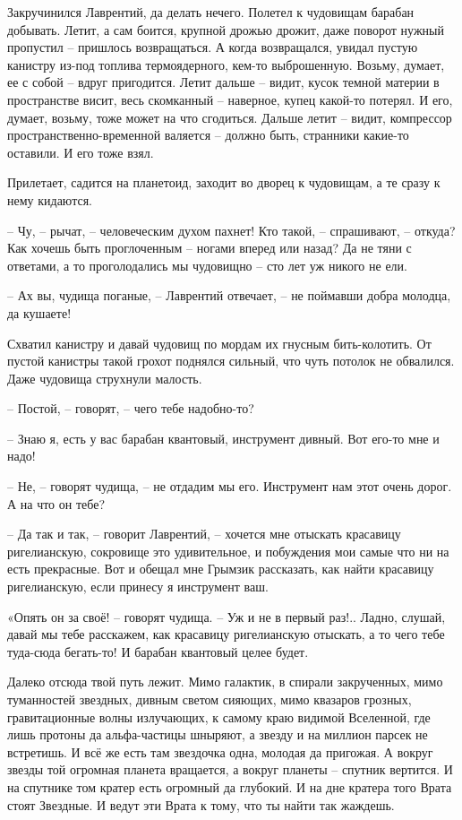 \documentclass[ebook,oneside,final,openright]{memoir}
\begin{document}
\par
Закручинился Лаврентий, да делать нечего. Полетел к чудовищам барабан добывать. Летит, а сам боится, крупной дрожью дрожит, даже поворот нужный пропустил – пришлось возвращаться. А когда возвращался, увидал пустую канистру из-под топлива термоядерного, кем-то выброшенную. Возьму, думает, ее с собой – вдруг пригодится. Летит дальше – видит, кусок темной материи в пространстве висит, весь скомканный – наверное, купец какой-то потерял. И его, думает, возьму, тоже может на что сгодиться. Дальше летит – видит, компрессор пространственно-временной валяется – должно быть, странники какие-то оставили. И его тоже взял.\par
\par
Прилетает, садится на планетоид, заходит во дворец к чудовищам, а те сразу к нему кидаются. \par
– Чу, – рычат, – человеческим духом пахнет! Кто такой, – спрашивают, – откуда? Как хочешь быть проглоченным – ногами вперед или назад? Да не тяни с ответами, а то проголодались мы чудовищно – сто лет уж никого не ели.\par
– Ах вы, чудища поганые, – Лаврентий отвечает, – не поймавши добра молодца, да кушаете! \par
Схватил канистру и давай чудовищ по мордам их гнусным бить-колотить. От пустой канистры такой грохот поднялся сильный, что чуть потолок не обвалился. Даже чудовища струхнули малость. \par
– Постой, – говорят, – чего тебе надобно-то?\par
– Знаю я, есть у вас барабан квантовый, инструмент дивный. Вот его-то мне и надо!\par
– Не, – говорят чудища, – не отдадим мы его. Инструмент нам этот очень дорог. А на что он тебе? \par
– Да так и так, – говорит Лаврентий, – хочется мне отыскать красавицу ригелианскую, сокровище это удивительное, и побуждения мои самые что ни на есть прекрасные. Вот и обещал мне Грымзик рассказать, как найти красавицу ригелианскую, если принесу я инструмент ваш. \par
\par
«Опять он за своё! – говорят чудища. – Уж и не в первый раз!.. Ладно, слушай, давай мы тебе расскажем, как красавицу ригелианскую отыскать, а то чего тебе туда-сюда бегать-то! И барабан квантовый целее будет. \par
\par
Далеко отсюда твой путь лежит. Мимо галактик, в спирали закрученных, мимо туманностей звездных, дивным светом сияющих, мимо квазаров грозных, гравитационные волны излучающих, к самому краю видимой Вселенной, где лишь протоны да альфа-частицы шныряют, а звезду и на миллион парсек не встретишь. И всё же есть там звездочка одна, молодая да пригожая. А вокруг звезды той огромная планета вращается, а вокруг планеты – спутник вертится. И на спутнике том кратер есть огромный да глубокий. И на дне кратера того Врата стоят Звездные. И ведут эти Врата к тому, что ты найти так жаждешь.\par
\end{document}
